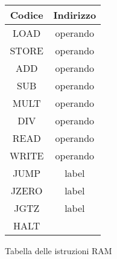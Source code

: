 \begin{figure}[!h]
    \centering
    \begin{tabular}{|c c|}
        \hline
        Codice & Indirizzo \\
        \hline
        LOAD   & operando  \\
        STORE  & operando  \\
        ADD    & operando  \\
        SUB    & operando  \\
        MULT   & operando  \\
        DIV    & operando  \\
        READ   & operando  \\
        WRITE  & operando  \\
        JUMP   & label     \\
        JZERO  & label     \\
        JGTZ   & label     \\
        HALT   &           \\
        \hline
    \end{tabular}
    \caption{Tabella delle istruzioni RAM}
    \label{Fig:2.1}
\end{figure}